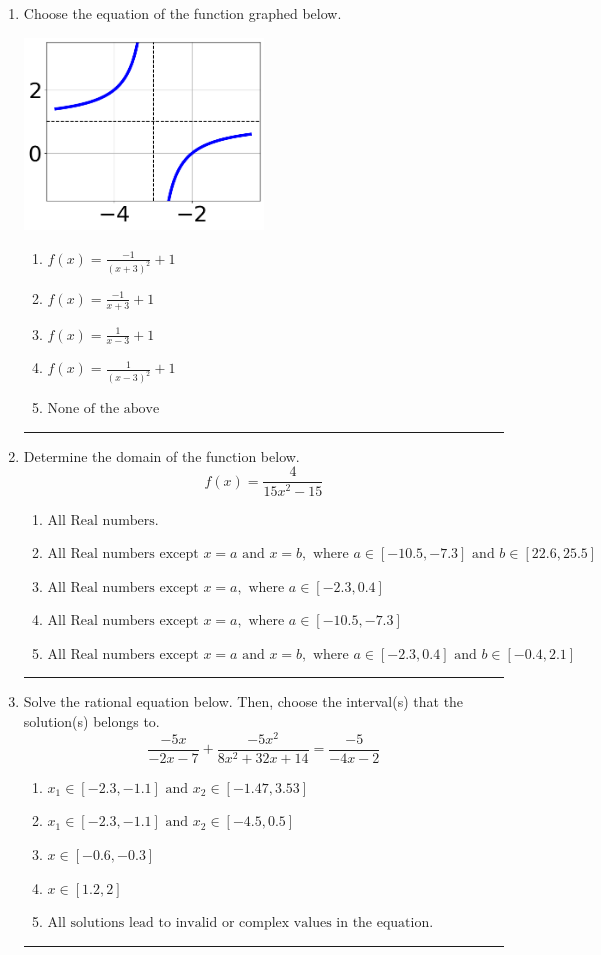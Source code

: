 \documentclass[14pt]{extbook}
\newcommand{\litem}[1]{\item#1\hspace*{-1cm}\rule{\textwidth}{0.4pt}}
\begin{document}
\begin{enumerate}
{\begin{enumerate}[label=\Alph*.]
\end{enumerate} }
\litem{
Choose the equation of the function graphed below.
\begin{center}
    \includegraphics[width=0.5\textwidth]{../Figures/rationalGraphToEquationB.png}
\end{center}
\begin{enumerate}[label=\Alph*.]
\item \( f(x) = \frac{-1}{(x + 3)^2} + 1 \)
\item \( f(x) = \frac{-1}{x + 3} + 1 \)
\item \( f(x) = \frac{1}{x - 3} + 1 \)
\item \( f(x) = \frac{1}{(x - 3)^2} + 1 \)
\item \( \text{None of the above} \)

\end{enumerate} }
\litem{
Determine the domain of the function below.\[ f(x) = \frac{4}{15x^{2} -15} \]\begin{enumerate}[label=\Alph*.]
\item \( \text{All Real numbers.} \)
\item \( \text{All Real numbers except } x = a \text{ and } x = b, \text{ where } a \in [-10.5, -7.3] \text{ and } b \in [22.6, 25.5] \)
\item \( \text{All Real numbers except } x = a, \text{ where } a \in [-2.3, 0.4] \)
\item \( \text{All Real numbers except } x = a, \text{ where } a \in [-10.5, -7.3] \)
\item \( \text{All Real numbers except } x = a \text{ and } x = b, \text{ where } a \in [-2.3, 0.4] \text{ and } b \in [-0.4, 2.1] \)

\end{enumerate} }
\litem{
Solve the rational equation below. Then, choose the interval(s) that the solution(s) belongs to.\[ \frac{-5x}{-2x -7} + \frac{-5x^{2}}{8x^{2} +32 x + 14} = \frac{-5}{-4x -2} \]\begin{enumerate}[label=\Alph*.]
\item \( x_1 \in [-2.3, -1.1] \text{ and } x_2 \in [-1.47,3.53] \)
\item \( x_1 \in [-2.3, -1.1] \text{ and } x_2 \in [-4.5,0.5] \)
\item \( x \in [-0.6,-0.3] \)
\item \( x \in [1.2,2] \)
\item \( \text{All solutions lead to invalid or complex values in the equation.} \)


\end{enumerate}}
\end{enumerate}
\end{document}
